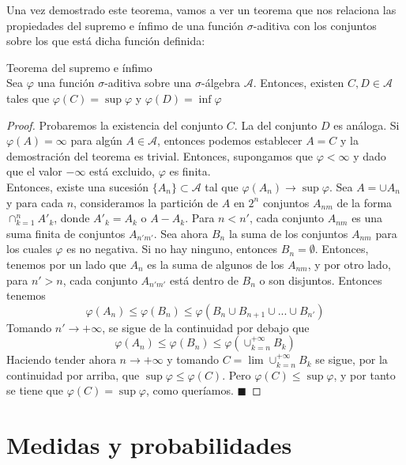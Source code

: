 \documentclass[12pt,a4paper]{book}
\newcommand*{\qed}{\hfill\ensuremath{\blacksquare}}
\begin{document}
Una vez demostrado este teorema, vamos a ver un teorema que nos relaciona las propiedades del supremo e ínfimo de una función $\sigma$-aditiva con los conjuntos sobre los que está dicha función definida:

\begin{theorem}
Teorema del supremo e ínfimo\\

Sea $\varphi$ una función $\sigma$-aditiva sobre una $\sigma$-álgebra $\mathcal{A}$. Entonces, existen $C,D \in \mathcal{A}$ tales que $\varphi (C) = \sup \varphi$ y $\varphi (D) = \inf \varphi$
\end{theorem}

\begin{proof}
Probaremos la existencia del conjunto $C$. La del conjunto $D$ es análoga. Si $\varphi(A) = \infty$ para algún $A \in \mathcal{A}$, entonces podemos establecer $A = C$ y la demostración del teorema es trivial. Entonces, supongamos que $\varphi < \infty$ y dado que el valor $-\infty$ está excluido, $\varphi$ es finita.\\

Entonces, existe una sucesión $\{A_n\} \subset \mathcal{A}$ tal que $\varphi(A_n) \to \sup \varphi$. Sea $A = \cup A_n $ y para cada $n$, consideramos la partición de $A$ en $2^n$ conjuntos $A_{nm}$ de la forma $\displaystyle \cap_{k=1}^n A'_k$, donde $A'_k = A_k$ o $A - A_k$. Para $n < n'$, cada conjunto $A_{nm}$ es una suma finita de conjuntos $A_{n'm'}$. Sea ahora $B_n$ la suma de los conjuntos $A_{nm}$ para los cuales $\varphi$ es no negativa. Si no hay ninguno, entonces $B_n = \emptyset$. Entonces, tenemos por un lado que $A_n$ es la suma de algunos de los $A_{nm}$, y por otro lado, para $n' > n$, cada conjunto $A_{n'm'}$ está dentro de $B_n$ o son disjuntos. Entonces tenemos
$$ \varphi(A_n) \leq \varphi(B_n) \leq \varphi (B_n \cup B_{n+1} \cup ... \cup B_{n'}) $$
Tomando $n' \to +\infty$, se sigue de la continuidad por debajo que
$$ \varphi(A_n) \leq \varphi (B_n) \leq \varphi \left( \cup_{k=n}^{+\infty} B_k\right) $$
Haciendo tender ahora $n \to +\infty$ y tomando $\displaystyle C = \lim \cup_{k = n}^{+\infty} B_k$ se sigue, por la continuidad por arriba, que $\sup \varphi \leq \varphi(C)$. Pero $\varphi(C) \leq \sup \varphi$, y por tanto se tiene que $\varphi(C) = \sup \varphi$, como queríamos.
\qed
\end{proof}

\chapter{Medidas y probabilidades}
\end{document}

